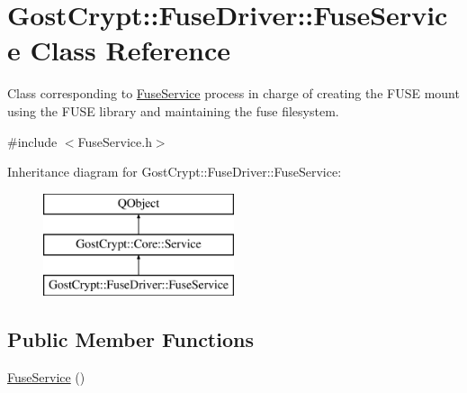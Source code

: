 \hypertarget{class_gost_crypt_1_1_fuse_driver_1_1_fuse_service}{}\section{Gost\+Crypt\+:\+:Fuse\+Driver\+:\+:Fuse\+Service Class Reference}
\label{class_gost_crypt_1_1_fuse_driver_1_1_fuse_service}


Class corresponding to \hyperlink{class_gost_crypt_1_1_fuse_driver_1_1_fuse_service}{Fuse\+Service} process in charge of creating the F\+U\+SE mount using the F\+U\+SE library and maintaining the fuse filesystem.  




{\ttfamily \#include $<$Fuse\+Service.\+h$>$}

Inheritance diagram for Gost\+Crypt\+:\+:Fuse\+Driver\+:\+:Fuse\+Service\+:\begin{figure}[H]
\begin{center}
\leavevmode
\includegraphics[height=3.000000cm]{class_gost_crypt_1_1_fuse_driver_1_1_fuse_service}
\end{center}
\end{figure}
\subsection*{Public Member Functions}
\begin{DoxyCompactItemize}
\item 
\hyperlink{class_gost_crypt_1_1_fuse_driver_1_1_fuse_service_a66af9d3e0da8336d6ba39f3c37eb8ffe}{Fuse\+Service} ()
\end{DoxyCompactItemize}
